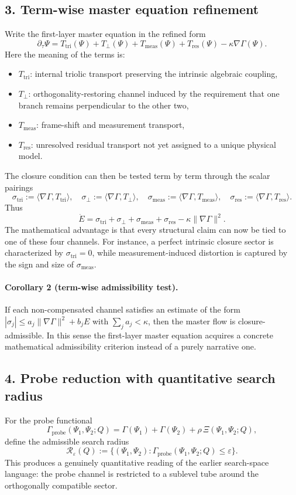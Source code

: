 \subsection*{3. Term-wise master equation refinement}
Write the first-layer master equation in the refined form
\[
\partial_\tau \Psi
= T_{\mathrm{tri}}(\Psi)
+ T_{\perp}(\Psi)
+ T_{\mathrm{meas}}(\Psi)
+ T_{\mathrm{res}}(\Psi)
- \kappa\nabla\Gamma(\Psi).
\]
Here the meaning of the terms is:
\begin{itemize}
    \item $T_{\mathrm{tri}}$: internal triolic transport preserving the intrinsic
    algebraic coupling,
    \item $T_{\perp}$: orthogonality-restoring channel induced by the requirement
    that one branch remains perpendicular to the other two,
    \item $T_{\mathrm{meas}}$: frame-shift and measurement transport,
    \item $T_{\mathrm{res}}$: unresolved residual transport not yet assigned to a
    unique physical model.
\end{itemize}
The closure condition can then be tested term by term through the scalar
pairings
\[
\sigma_{\mathrm{tri}}:=\langle \nabla\Gamma,T_{\mathrm{tri}}\rangle,
\quad
\sigma_{\perp}:=\langle \nabla\Gamma,T_{\perp}\rangle,
\quad
\sigma_{\mathrm{meas}}:=\langle \nabla\Gamma,T_{\mathrm{meas}}\rangle,
\quad
\sigma_{\mathrm{res}}:=\langle \nabla\Gamma,T_{\mathrm{res}}\rangle.
\]
Thus
\[
\dot E = \sigma_{\mathrm{tri}}+\sigma_{\perp}+\sigma_{\mathrm{meas}}+\sigma_{\mathrm{res}}
-\kappa\|\nabla\Gamma\|^2.
\]
The mathematical advantage is that every structural claim can now be tied to one
of these four channels. For instance, a perfect intrinsic closure sector is
characterized by $\sigma_{\mathrm{tri}}=0$, while measurement-induced distortion is
captured by the sign and size of $\sigma_{\mathrm{meas}}$.

\paragraph{Corollary 2 (term-wise admissibility test).}
If each non-compensated channel satisfies an estimate of the form
$|\sigma_j|\le a_j\|\nabla\Gamma\|^2+b_jE$ with $\sum_j a_j<\kappa$, then the
master flow is closure-admissible. In this sense the first-layer master
equation acquires a concrete mathematical admissibility criterion instead of a
purely narrative one.

\subsection*{4. Probe reduction with quantitative search radius}
For the probe functional
\[
\Gamma_{\mathrm{probe}}(\Psi_1,\Psi_2;Q)
=\Gamma(\Psi_1)+\Gamma(\Psi_2)+\rho\,\Xi(\Psi_1,\Psi_2;Q),
\]
define the admissible search radius
\[
\mathcal R_\varepsilon(Q):=
\{(\Psi_1,\Psi_2):\Gamma_{\mathrm{probe}}(\Psi_1,\Psi_2;Q)\le \varepsilon\}.
\]
This produces a genuinely quantitative reading of the earlier search-space
language: the probe channel is restricted to a sublevel tube around the
orthogonally compatible sector.

